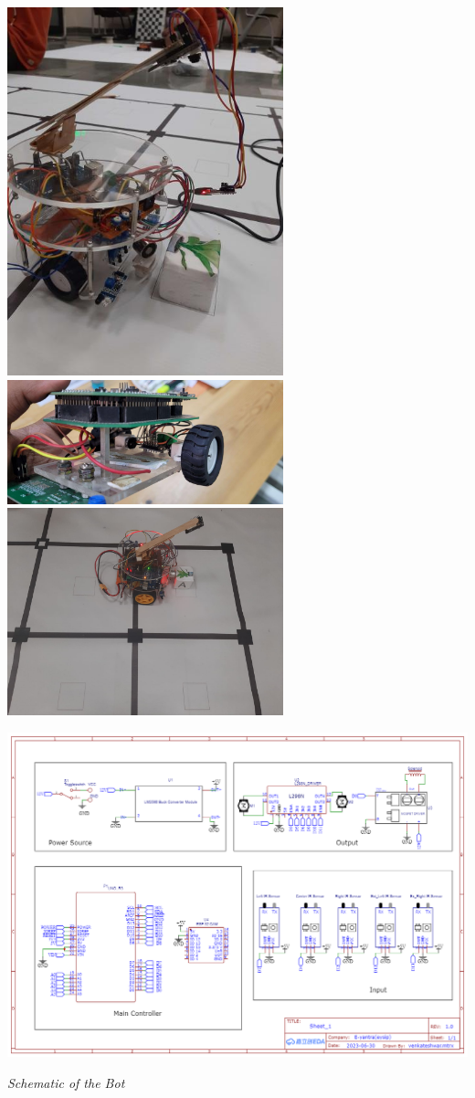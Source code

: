 \documentclass[a4paper,12pt,oneside]{book}
\begin{document}
\includegraphics[width=0.6\textwidth]{bot.jpg}
\includegraphics[width=0.6\textwidth]{initial bot3.jpg}
\includegraphics[width=0.6\textwidth]{grid bot.jpg}

\includegraphics[width=1\textwidth]{Schematic_Ai_collective bot_2023-07-14.png}
\caption{\textit{Schematic of the Bot}}
\newpage
\end{document}
